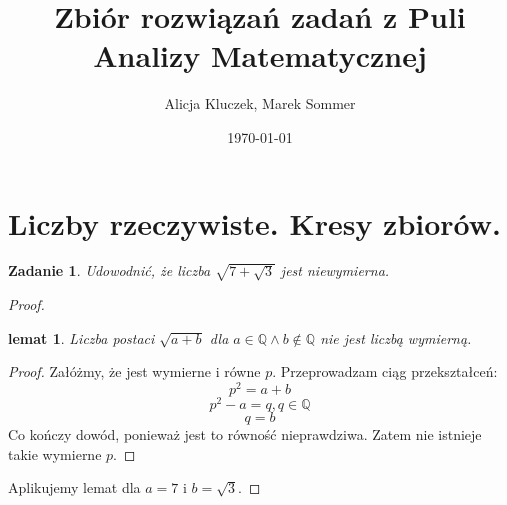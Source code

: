 \documentclass{article}
\newtheorem{problem}{Zadanie}
\newtheorem{lemma}{lemat}
\begin{document}
\title{Zbiór rozwiązań zadań z Puli Analizy Matematycznej}
\author{Alicja Kluczek, Marek Sommer}

\date{\today}
\maketitle
\newpage

\section{Liczby rzeczywiste. Kresy zbiorów.}

\begin{problem}
    Udowodnić, że liczba $\sqrt{7 + \sqrt{3}}$ jest
    niewymierna.
\end{problem}
\begin{proof}

    \begin{lemma}
        Liczba postaci $\sqrt{a + b}$ dla $a \in \mathbb{Q} \wedge b \notin \mathbb{Q}$
        nie jest liczbą wymierną.
    \end{lemma}
    \begin{proof}
        Załóżmy, że jest wymierne i równe $p$.
        Przeprowadzam ciąg przekształceń:
        $$ p^2 = a + b $$
        $$ p^2 - a = q, q \in \mathbb{Q} $$
        $$ q = b $$
        Co kończy dowód, ponieważ jest to równość nieprawdziwa.
        Zatem nie istnieje takie wymierne $p$.
    \end{proof}
    Aplikujemy lemat dla $a = 7$ i $b = \sqrt{3}$.
\end{proof}
\end{document}
